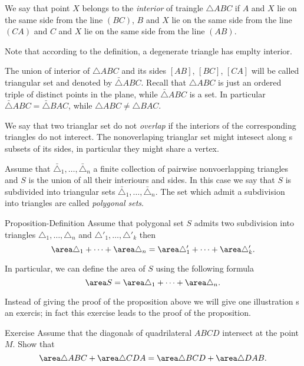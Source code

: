 {We say that point $X$ belongs to the \emph{interior} of traingle $\triangle ABC$
if $A$ and $X$ lie on the same side from the line $(BC)$,
$B$ and $X$ lie on the same side from the line $(CA)$
and 
$C$ and $X$ lie on the same side from the line $(AB)$.

Note that according to the definition,
a degenerate triangle has emplty interior.

The union of interior of $\triangle ABC$ and its sides $[AB]$, $[BC]$, $[CA]$
will be called triangular set and denoted by $\bar\triangle ABC$.
Recall that $\triangle ABC$ is just an ordered triple of distinct points in the plane,
while $\bar\triangle ABC$ is a set.
In particular $\bar\triangle ABC=\bar\triangle BAC$, while $\triangle ABC\ne\triangle BAC$.

We say that two trianglar set do not \emph{overlap} if the interiors of the corresponding triangles do not interect.
The nonoverlaping trianglar set might intesect along s subsets of its sides, in particular they might share a vertex.

Assume that  $\bar\triangle_1,\dots,\bar\triangle_n$ a finite collection of pairwise nonvoerlapping triangles
and $S$ is the union of all their interiours and sides.
In this case we say that $S$ is subdivided into triangular sets $\bar\triangle_1,\dots,\bar\triangle_n$.
The set which admit a subdivision into triangles are called \emph{polygonal sets}.

\begin{thm}{Proposition-Definition}
Assume that polygonal set $S$ admits two subdivision into triangles
$\triangle_1,\dots,\triangle_n$
and $\triangle'_1,\dots,\triangle'_k$
then
\[\area\triangle_1+\dots+\area\triangle_n
=\area\triangle'_1+\dots+\area\triangle'_k.\]

In particular, we can define the area of $S$ using the following formula
\[\area S=\area\triangle_1+\dots+\area\triangle_n.\]

\end{thm}

Instead of giving the proof of the proposition above we will give one illustration s an exercis;
in fact this exercise leads to the proof of the proposition.

\begin{thm}{Exercise}
Assume that the diagonals of quadrilateral $ABCD$ intersect at the point $M$.
Show that
\[\area\triangle ABC+\area\triangle CDA=\area\triangle BCD+\area\triangle DAB.\]
\end{thm}

}
